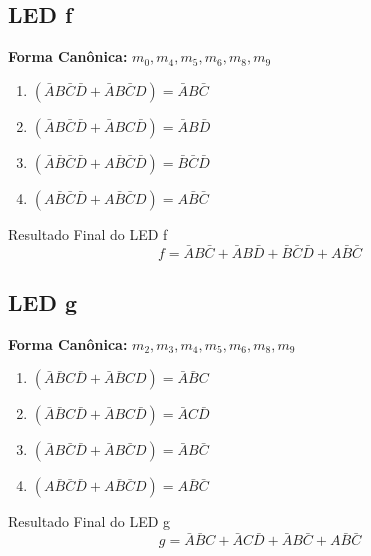 \documentclass[12pt]{article}
\begin{document}
\subsection*{LED \textbf{f}}
\textbf{Forma Canônica:} $m_0, m_4, m_5, m_6, m_8, m_9$
\begin{enumerate}
    \item $(\bar{A}B\bar{C}\bar{D} + \bar{A}B\bar{C}D) = \bar{A}B\bar{C}$
    \item $(\bar{A}B\bar{C}\bar{D} + \bar{A}BC\bar{D}) = \bar{A}B\bar{D}$
    \item $(\bar{A}\bar{B}\bar{C}\bar{D} + A\bar{B}\bar{C}\bar{D}) = \bar{B}\bar{C}\bar{D}$
    \item $(A\bar{B}\bar{C}\bar{D} + A\bar{B}\bar{C}D) = A\bar{B}\bar{C}$
\end{enumerate}
\begin{block}{Resultado Final do LED f}
  \[ f = \bar{A}B\bar{C} + \bar{A}B\bar{D} + \bar{B}\bar{C}\bar{D} + A\bar{B}\bar{C} \]
\end{block}

\subsection*{LED \textbf{g}}
\textbf{Forma Canônica:} $m_2, m_3, m_4, m_5, m_6, m_8, m_9$
\begin{enumerate}
    \item $(\bar{A}\bar{B}C\bar{D} + \bar{A}\bar{B}CD) = \bar{A}\bar{B}C$
    \item $(\bar{A}\bar{B}C\bar{D} + \bar{A}BC\bar{D}) = \bar{A}C\bar{D}$
    \item $(\bar{A}B\bar{C}\bar{D} + \bar{A}B\bar{C}D) = \bar{A}B\bar{C}$
    \item $(A\bar{B}\bar{C}\bar{D} + A\bar{B}\bar{C}D) = A\bar{B}\bar{C}$
\end{enumerate}
\begin{block}{Resultado Final do LED g}
  \[ g = \bar{A}\bar{B}C + \bar{A}C\bar{D} + \bar{A}B\bar{C} + A\bar{B}\bar{C} \]
\end{block}
\end{document}
